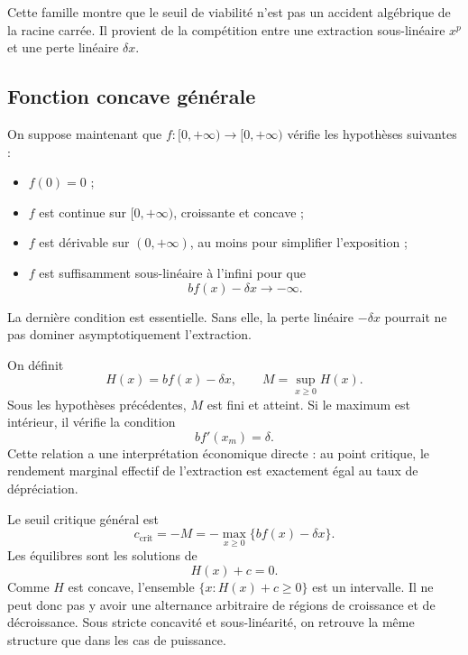 \documentclass[11pt,a4paper]{article}
\begin{document}
Cette famille montre que le seuil de viabilité n'est pas un accident algébrique de la racine carrée. Il provient de la compétition entre une extraction sous-linéaire \(x^p\) et une perte linéaire \(\delta x\).

\subsection{Fonction concave générale}

On suppose maintenant que \(f:[0,+\infty)\to[0,+\infty)\) vérifie les hypothèses suivantes :
\begin{itemize}
    \item \(f(0)=0\) ;
    \item \(f\) est continue sur \([0,+\infty)\), croissante et concave ;
    \item \(f\) est dérivable sur \((0,+\infty)\), au moins pour simplifier l'exposition ;
    \item \(f\) est suffisamment sous-linéaire à l'infini pour que
    \[
        b f(x)-\delta x\longrightarrow -\infty.
    \]
\end{itemize}
La dernière condition est essentielle. Sans elle, la perte linéaire \(-\delta x\) pourrait ne pas dominer asymptotiquement l'extraction.

On définit
\[
    H(x)=b f(x)-\delta x,
    \qquad
    M=\sup_{x\geq 0}H(x).
\]
Sous les hypothèses précédentes, \(M\) est fini et atteint. Si le maximum est intérieur, il vérifie la condition
\begin{equation}
    b f'(x_m)=\delta.
    \label{eq:general_condition}
\end{equation}
Cette relation a une interprétation économique directe : au point critique, le rendement marginal effectif de l'extraction est exactement égal au taux de dépréciation.

Le seuil critique général est
\begin{equation}
    c_{\mathrm{crit}}=-M
    =
    -\max_{x\geq 0}\{b f(x)-\delta x\}.
    \label{eq:general_ccrit}
\end{equation}
Les équilibres sont les solutions de
\[
    H(x)+c=0.
\]
Comme \(H\) est concave, l'ensemble \(\{x:H(x)+c\geq 0\}\) est un intervalle. Il ne peut donc pas y avoir une alternance arbitraire de régions de croissance et de décroissance. Sous stricte concavité et sous-linéarité, on retrouve la même structure que dans les cas de puissance.
\end{document}
